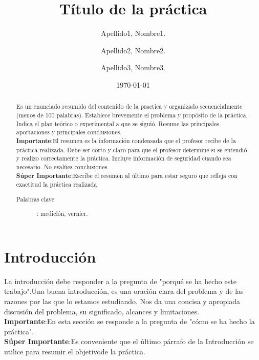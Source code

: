 \documentclass[%
 reprint,
 amsmath,amssymb,
 aps,
]{revtex4-2}
\begin{document}

\title{T\'itulo de la pr\'actica}%

\author{Apellido1, Nombre1.}
\author{Apellido2, Nombre2.}
\author{Apellido3, Nombre3.}

\date{\today}%

\begin{abstract}
Es un enunciado resumido del  contenido de  la  practica y  organizado secuencialmente  (menos de 100 palabras). Establece brevemente el problema y propósito de la práctica. Indica el plan teórico o experimental a que se siguió. Resume las principales aportaciones y principales conclusiones.\\ \textbf{Importante}:El  resumen  es  la  información  condensada  que  el  profesor  recibe  de  la  práctica realizada.  Debe  ser  corto  y  claro  para  que  el  profesor  determine  si  se  entendió  y  realizo correctamente  la  práctica.  Incluye  información  de  seguridad  cuando  sea  necesario.  No  evalúes conclusiones.\\\textbf{Súper  Importante}:Escribe  el  resumen  al  último  para  estar  seguro  que  refleja  con  exactitud  la práctica realizada
\begin{description}
\item[Palabras clave]: medición, vernier.
\end{description}
\end{abstract}

\maketitle


\section{\label{sec:introduccion}Introducción}

 La  introducción  debe  responder  a  la  pregunta  de  "porqué  se  ha  hecho  este  trabajo".Una  buena introducción,  es  una  oración  clara  del  problema  y  de  las  razones  por  las  que  lo  estamos estudiando.  Nos  da  una  concisa  y  apropiada  discusión  del  problema,  su  significado,  alcances  y limitaciones.\\\textbf{Importante}:En esta sección se responde a la pregunta de "cómo se ha hecho la práctica".\\\textbf{Súper Importante}:Es conveniente que el último párrafo de la Introducción se utilice para resumir el objetivode la práctica.
\end{document}
